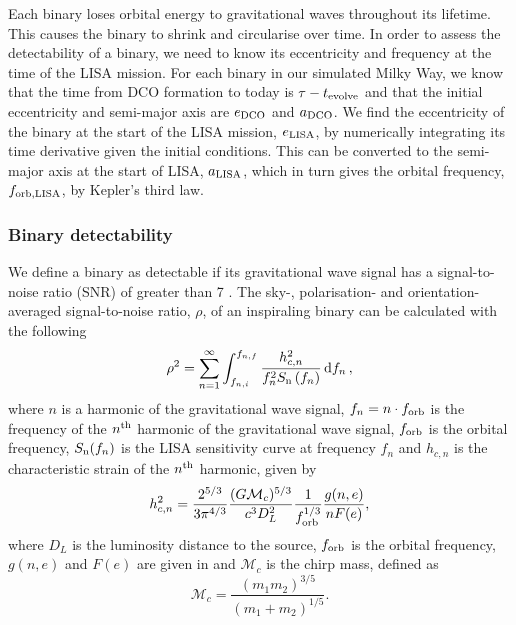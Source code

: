Each binary loses orbital energy to gravitational waves throughout its lifetime. This causes the binary to shrink and circularise over time. In order to assess the detectability of a binary, we need to know its eccentricity and frequency at the time of the LISA mission. For each binary in our simulated Milky Way, we know that the time from DCO formation to today is $\tau - t_{\rm evolve}$ and that the initial eccentricity and semi-major axis are $e_{\rm DCO}$ and $a_{\rm DCO}$. We find the eccentricity of the binary at the start of the LISA mission, $e_{\rm LISA}$, by numerically integrating its time derivative \citep[][Eq. 5.13]{Peters+1964} given the initial conditions. This can be converted to the semi-major axis at the start of LISA, $a_{\rm LISA} $\citep[][Eq. 5.11]{Peters+1964}, which in turn gives the orbital frequency, $f_{\rm orb, LISA}$, by Kepler's third law.

\subsubsection{Binary detectability}

We define a binary as detectable if its gravitational wave signal has a signal-to-noise ratio (SNR) of greater than 7 \citep[e.g.][]{Breivik+2020, Korol+2020}. The sky-, polarisation- and orientation-averaged signal-to-noise ratio, $\rho$, of an inspiraling binary can be calculated with the following \citep[e.g.][]{Finn+2000}
\begin{equation}\label{eq:snr}
    \rho^2 = \sum_{n=1}^{\infty} \int_{f_{n, i}}^{f_{n, f}} \frac{h_{c, n}^{2}}{f_{n}^{2} S_{\rm n}\left(f_{n}\right)} \dd{f_n},
\end{equation}
where $n$ is a harmonic of the gravitational wave signal, $f_n = n \cdot f_{\rm orb}$ is the frequency of the $n^{\rm th}$ harmonic of the gravitational wave signal, $f_{\rm orb}$ is the orbital frequency, $S_{\rm n}(f_n)$ is the LISA sensitivity curve at frequency $f_n$ \citep[e.g.][]{Robson+2019} and $h_{c,n}$ is the characteristic strain of the $n^{\rm th}$ harmonic, given by \citep[e.g.][]{Barack+2004}
\begin{equation}\label{eq:charstrain}
    h^2_{c,n} = \frac{2^{5/3}}{3 \pi^{4/3}} \frac{(G \mathcal{M}_c)^{5/3}}{c^3 D_L^2} \frac{1}{f_{\rm orb}^{1/3}} \frac{g(n,e)}{n F(e)},
\end{equation}
where $D_L$ is the luminosity distance to the source, $f_{\rm orb}$ is the orbital frequency, $g(n, e)$ and $F(e)$ are given in \citet{Peters+1963} and $\mathcal{M}_c$ is the chirp mass, defined as
\begin{equation}\label{eq:chirp_mass}
    \mathcal{M}_c = \frac{(m_1 m_2)^{3/5}}{(m_1 + m_2)^{1/5}}.
\end{equation}

